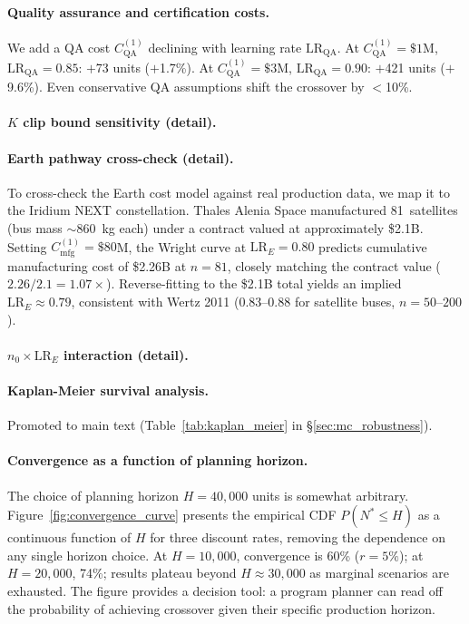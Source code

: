 \paragraph{Quality assurance and certification costs.} We add a QA cost $C_{\mathrm{QA}}^{(1)}$ declining with learning rate $\mathrm{LR}_{\mathrm{QA}}$. At $C_{\mathrm{QA}}^{(1)} = \$1$M, $\mathrm{LR}_{\mathrm{QA}} = 0.85$: $+$73 units ($+$1.7\%). At $C_{\mathrm{QA}}^{(1)} = \$3$M, $\mathrm{LR}_{\mathrm{QA}} = 0.90$: $+$421 units ($+$9.6\%). Even conservative QA assumptions shift the crossover by $<$10\%.

\paragraph{$K$ clip bound sensitivity (detail).}



\paragraph{Earth pathway cross-check (detail).} To cross-check the Earth cost model against real production data, we map it to the Iridium NEXT constellation. Thales Alenia Space manufactured 81~satellites (bus mass $\sim$860~kg each) under a contract valued at approximately \$2.1B. Setting $C_{\mathrm{mfg}}^{(1)} = \$80$M, the Wright curve at $\mathrm{LR}_E = 0.80$ predicts cumulative manufacturing cost of \$2.26B at $n = 81$, closely matching the contract value ($2.26/2.1 = 1.07\times$). Reverse-fitting to the \$2.1B total yields an implied $\mathrm{LR}_E \approx 0.79$, consistent with Wertz 2011 \cite{wertz2011} (0.83--0.88 for satellite buses, $n = 50$--$200$).

\paragraph{$n_0 \times \mathrm{LR}_E$ interaction (detail).}



\paragraph{Kaplan-Meier survival analysis.} Promoted to main text (Table~\ref{tab:kaplan_meier} in \S\ref{sec:mc_robustness}).

\paragraph{Convergence as a function of planning horizon.} The choice of planning horizon $H = 40{,}000$ units is somewhat arbitrary. Figure~\ref{fig:convergence_curve} presents the empirical CDF $P(N^* \leq H)$ as a continuous function of $H$ for three discount rates, removing the dependence on any single horizon choice. At $H = 10{,}000$, convergence is 60\% ($r = 5\%$); at $H = 20{,}000$, 74\%; results plateau beyond $H \approx 30{,}000$ as marginal scenarios are exhausted. The figure provides a decision tool: a program planner can read off the probability of achieving crossover given their specific production horizon.

